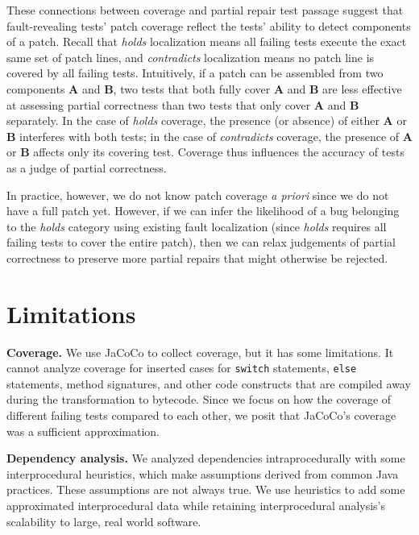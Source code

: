 \documentclass[10pt, conference]{IEEEtran}
\begin{document}
These connections between coverage and partial repair test passage
suggest that fault-revealing tests' patch coverage reflect the tests' ability
to detect components of a patch.
Recall that \emph{holds} localization means all failing tests execute 
the exact same set of patch lines, and \emph{contradicts} localization 
means no patch line is covered by all failing tests.
Intuitively, if a patch can be
assembled from two components \textbf{A} and \textbf{B}, two tests that both
fully cover \textbf{A} and \textbf{B} are less effective at assessing partial
correctness than two tests that only cover \textbf{A} and \textbf{B} separately.
In the case of \emph{holds} coverage, the presence (or absence) of either \textbf{A} or 
\textbf{B} interferes with both tests; in the case of \emph{contradicts} coverage, the presence of 
\textbf{A} or \textbf{B} affects only its covering test.
Coverage thus influences the accuracy of tests as a judge of partial correctness.

In practice, however, we do not know patch coverage \emph{a priori}  
since we do not have a full patch yet. However, if we can infer the
likelihood of a bug belonging to the \emph{holds} category using existing 
fault localization (since \emph{holds} requires all failing tests to cover the 
entire patch), then we can relax judgements of partial correctness to 
preserve more partial repairs that might otherwise be rejected.

\section{Limitations}
\label{sec:limits}

\noindent\textbf{Coverage.}
We use JaCoCo to collect coverage, but it has some
limitations. It cannot analyze coverage for inserted
cases for \texttt{switch} statements, \texttt{else} statements, method
signatures, and other code constructs that are compiled away during the
transformation to bytecode. Since we focus on how the coverage of different
failing tests compared to each other, we posit that JaCoCo's coverage was a
sufficient approximation.

\vspace{1ex}
\noindent\textbf{Dependency analysis.}
We analyzed dependencies intraprocedurally with some interprocedural 
heuristics, which make assumptions derived from common Java practices.
These assumptions are not always true. We use heuristics to add some
approximated interprocedural data while retaining interprocedural 
analysis's scalability to large, real world software.
\end{document}

